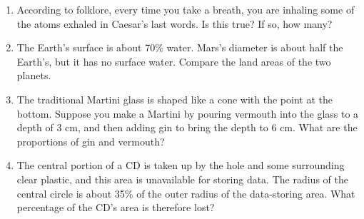 \begin{enumerate}
\item  According to folklore, every time you take a breath, you
are inhaling some of the atoms exhaled in Caesar's
last words. Is this true? If so, how many?

\item  The Earth's surface is about 70\% water. Mars's diameter
is about half the Earth's, but it has no surface water.
Compare the land areas of the two planets.

\item 
  The traditional Martini glass is shaped like a cone
with the point at the bottom. Suppose you make a Martini by
pouring vermouth into the glass to a depth of 3 cm, and then
adding gin to bring the depth to 6 cm. What are the
proportions of gin and vermouth?

\item 
 The central portion of a CD is taken up by the hole
and some surrounding clear plastic, and this area is
unavailable for storing data. The radius of the central
circle is about 35\% of the outer radius of the data-storing area.
What percentage of the CD's area is therefore lost? 

\newcommand{\tikzAngleOfLine}{\tikz@AngleOfLine}
  \def\tikz@AngleOfLine(#1)(#2)#3{%
  \pgfmathanglebetweenpoints{%
    \pgfpointanchor{#1}{center}}{%
    \pgfpointanchor{#2}{center}}
  \pgfmathsetmacro{#3}{\pgfmathresult}%
 }

\end{enumerate}
